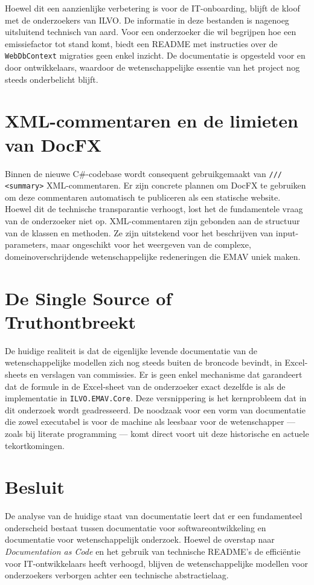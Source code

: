 Hoewel dit een aanzienlijke verbetering is voor de IT-onboarding, blijft de kloof met de onderzoekers van ILVO. De informatie in deze bestanden is nagenoeg uitsluitend technisch van aard. Voor een onderzoeker die wil begrijpen hoe een emissiefactor tot stand komt, biedt een README met instructies over de \texttt{WebDbContext} migraties geen enkel inzicht. De documentatie is opgesteld voor en door ontwikkelaars, waardoor de wetenschappelijke essentie van het project nog steeds onderbelicht blijft.

\section{XML-commentaren en de limieten van DocFX}
Binnen de nieuwe C\#-codebase wordt consequent gebruikgemaakt van \texttt{/// <summary>} XML-commentaren. Er zijn concrete plannen om DocFX te gebruiken om deze commentaren automatisch te publiceren als een statische website. Hoewel dit de technische transparantie verhoogt, lost het de fundamentele vraag van de onderzoeker niet op. XML-commentaren zijn gebonden aan de structuur van de klassen en methoden. Ze zijn uitstekend voor het beschrijven van input-parameters, maar ongeschikt voor het weergeven van de complexe, domeinoverschrijdende wetenschappelijke redeneringen die EMAV uniek maken.

\section{De \textquotedbl Single Source of Truth\textquotedbl \@ ontbreekt}
De huidige realiteit is dat de eigenlijke levende documentatie van de wetenschappelijke modellen zich nog steeds buiten de broncode bevindt, in Excel-sheets en verslagen van commissies. Er is geen enkel mechanisme dat garandeert dat de formule in de Excel-sheet van de onderzoeker exact dezelfde is als de implementatie in \texttt{ILVO.EMAV.Core}. Deze versnippering is het kernprobleem dat in dit onderzoek wordt geadresseerd. De noodzaak voor een vorm van documentatie die zowel executabel is voor de machine als leesbaar voor de wetenschapper — zoals bij literate programming — komt direct voort uit deze historische en actuele tekortkomingen.

\section{Besluit}
De analyse van de huidige staat van documentatie leert dat er een fundamenteel onderscheid bestaat tussen documentatie voor softwareontwikkeling en documentatie voor wetenschappelijk onderzoek. Hoewel de overstap naar \textit{Documentation as Code} en het gebruik van technische README's de efficiëntie voor IT-ontwikkelaars heeft verhoogd, blijven de wetenschappelijke modellen voor onderzoekers verborgen achter een technische abstractielaag.

